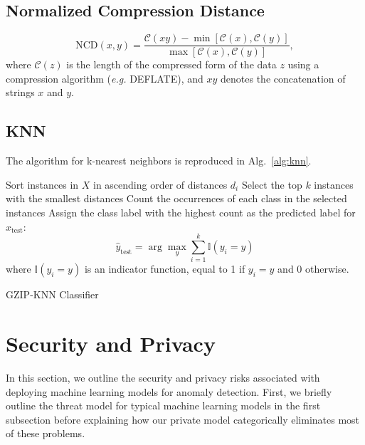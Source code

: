 \documentclass[sigconf]{acmart}
\begin{document}
\subsection{Normalized Compression Distance}

\begin{equation}
    \text{NCD}(x, y) = \frac{\mathcal{C}(xy) - \min[\mathcal{C}(x), \mathcal{C}(y)]}{\max[\mathcal{C}(x), \mathcal{C}(y)]},
\end{equation}
where $\mathcal{C}(z)$ is the length  of the compressed form of the data $z$ using a compression algorithm (\textit{e.g.} DEFLATE), and $xy$ denotes the concatenation of strings $x$ and $y$.



\subsection{KNN}
The algorithm for k-nearest neighbors is reproduced in Alg.~\ref{alg:knn}.

\begin{algorithm}
    
    Sort instances in $X$ in ascending order of distances $d_i$\;
    Select the top $k$ instances with the smallest distances\;
    Count the occurrences of each class in the selected instances\;
    Assign the class label with the highest count as the predicted label for $x_{\text{test}}$:
    \[
    \hat{y}_{\text{test}} = \arg\max_y \sum_{i=1}^{k} \mathbb{I}(y_i = y)
    \]
    where $\mathbb{I}(y_i = y)$ is an indicator function, equal to 1 if $y_i = y$ and 0 otherwise.
    \caption{GZIP-KNN Classifier}
    \label{alg:knn}
\end{algorithm}

\section{Security and Privacy}
\label{security}
In this section, we outline the security and privacy risks associated with deploying machine learning models for anomaly detection. First, we briefly outline the threat model for typical machine learning models in the first subsection before explaining how our private model categorically eliminates most of these problems. 
\end{document}
